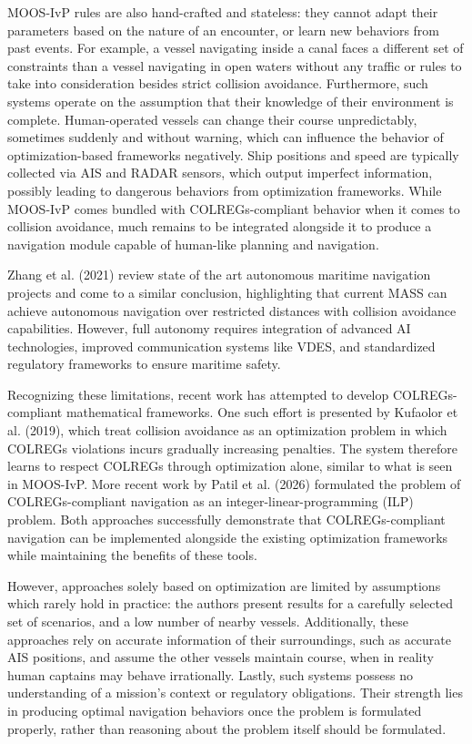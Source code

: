 \documentclass[10pt]{reportMaster}
\begin{document}
MOOS-IvP rules are also hand-crafted and stateless: they cannot adapt their parameters based on the nature of an encounter, or learn new behaviors from past events. For example, a vessel navigating inside a canal faces a different set of constraints than a vessel navigating in open waters without any traffic or rules to take into consideration besides strict collision avoidance. Furthermore, such systems operate on the assumption that their knowledge of their environment is complete. Human-operated vessels can change their course unpredictably, sometimes suddenly and without warning, which can influence the behavior of optimization-based frameworks negatively. Ship positions and speed are typically collected via AIS and RADAR sensors, which output imperfect information, possibly leading to dangerous behaviors from optimization frameworks. While MOOS-IvP comes bundled with COLREGs-compliant behavior when it comes to collision avoidance, much remains to be integrated alongside it to produce a navigation module capable of human-like planning and navigation. 

Zhang et al. (2021) review state of the art autonomous maritime navigation projects and come to a similar conclusion, highlighting that current MASS can achieve autonomous navigation over restricted distances with collision avoidance capabilities. However, full autonomy requires integration of advanced AI technologies, improved communication systems like VDES, and standardized regulatory frameworks to ensure maritime safety\cite{ZHANG2021109380}. 

Recognizing these limitations, recent work has attempted to develop COLREGs-compliant mathematical frameworks. One such effort is presented by Kufaolor et al. (2019)\cite{Kufoalor_Wilthil_Hagen_Brekke_Johansen_2019}, which treat collision avoidance as an optimization problem in which COLREGs violations incurs gradually increasing penalties. The system therefore learns to respect COLREGs through optimization alone, similar to what is seen in MOOS-IvP. More recent work by Patil et al. (2026)\cite{patil2026colregs} formulated the problem of COLREGs-compliant navigation as an integer-linear-programming (ILP) problem. Both approaches successfully demonstrate that COLREGs-compliant navigation can be implemented alongside the existing optimization frameworks while maintaining the benefits of these tools. 

However, approaches solely based on optimization are limited by assumptions which rarely hold in practice: the authors present results for a carefully selected set of scenarios, and a low number of nearby vessels. Additionally, these approaches rely on accurate information of their surroundings, such as accurate AIS positions, and assume the other vessels maintain course, when in reality human captains may behave irrationally. Lastly, such systems possess no understanding of a mission's context or regulatory obligations. Their strength lies in producing optimal navigation behaviors once the problem is formulated properly, rather than reasoning about the problem itself should be formulated. 
\end{document}
